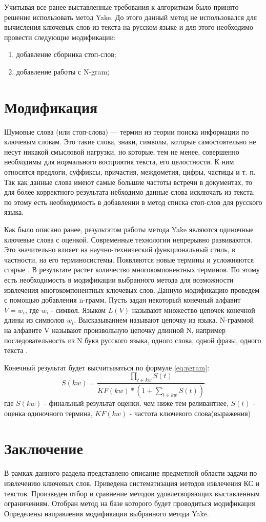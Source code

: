 Учитывая все ранее выставленные требования к алгоритмам было принято решение использовать метод Yake.
До этого данный метод не использовался для вычисления ключевых слов из текста на русском языке и для этого необходимо провести следующие модификации:
\begin{enumerate}
	\item добавление сборника стоп-слов;
	\item добавление работы с N-gram;
\end{enumerate}

\section{Модификация}
Шумовые слова (или стоп-слова) — термин из теории поиска информации по ключевым словам.
Это такие слова, знаки, символы, которые самостоятельно не несут никакой смысловой нагрузки, но
которые, тем не менее, совершенно необходимы для нормального восприятия текста, его целостности.
К ним относятся предлоги, суффиксы, причастия, междометия, цифры, частицы и т. п.
Так как данные слова имеют самые большие частоты встречи в документах, то для более корректного результата небходимо данные слова исключать из текста, по этому есть необходимость в добавлении в метод списка стоп-слов для русского языка.

Как было описано ранее, результатом работы метода Yake являются одиночные ключевые слова с оценкой.
Современные технологии непрерывно развиваются.
Это значительно влияет на научно-технический функциональный стиль, в частности, на его терминосистемы.
Появляются новые термины и усложняются старые \cite{22}.
В результате растет количество многокомпонентных терминов.
По этому есть необходимость в модификации выбранного метода для возможности извлечения многокомпонентных ключевых слов.
Данную модификацию проведем с помощью добавления n-грамм.
Пусть задан некоторый конечный алфавит $V = {w_i}$, где $w_i$ - символ. 
Языком $L(V)$ называют множество цепочек конечной длины из символов $w_i$.
Высказыванием называют цепочку из языка.
N-граммой на алфавите V называют произвольную цепочку длинной N, например последовательность из N букв русского языка, одного слова, одной фразы, одного текста \cite{21}.

Конечный результат будет высчитываться по формуле \eqref{eq:ngram}: 
\begin{equation}
	\label{eq:ngram}
	S(kw) = \frac{\prod_{t \in kw}S(t)}{KF(kw) * (1 + \sum_{t \in kw}S(t))}
\end{equation}
где $S(kw)$ - финальный результат оценки, чем ниже тем реливантнее, $S(t)$ - оценка одиночного термина,
$KF(kw)$ - частота ключевого слова(выражения)

\section{Заключение}
В рамках данного раздела представлено описание предметной области задачи по извлечению ключевых слов. 
Приведена систематизация методов извлечения КС и текстов.
Произведен отбор и сравнение методов удовлетворяющих выставленным ограничениям.
Отобран метод на базе которого будет проводиться модификация
Определены направления модификации выбранного метода Yake.



